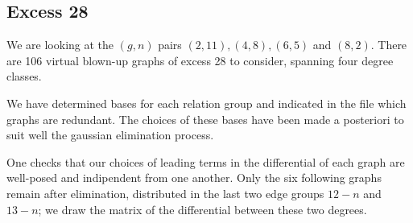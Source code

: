 




\subsection{Excess 28} We are looking at the $(g,n)$ pairs $(2,11),(4,8),(6,5)$ and $(8,2)$.
There are 106 virtual blown-up graphs of excess 28 to consider, spanning four degree classes.

We have determined bases for each relation group and indicated in the file which graphs are redundant. The choices of these bases have been made a posteriori to suit well the gaussian elimination process.

One checks that our choices of leading terms in the differential of each graph are well-posed and indipendent from one another. Only the six following graphs remain after elimination, distributed in the last two edge groups $12-n$ and $13-n$; we draw the matrix of the differential between these two degrees.

